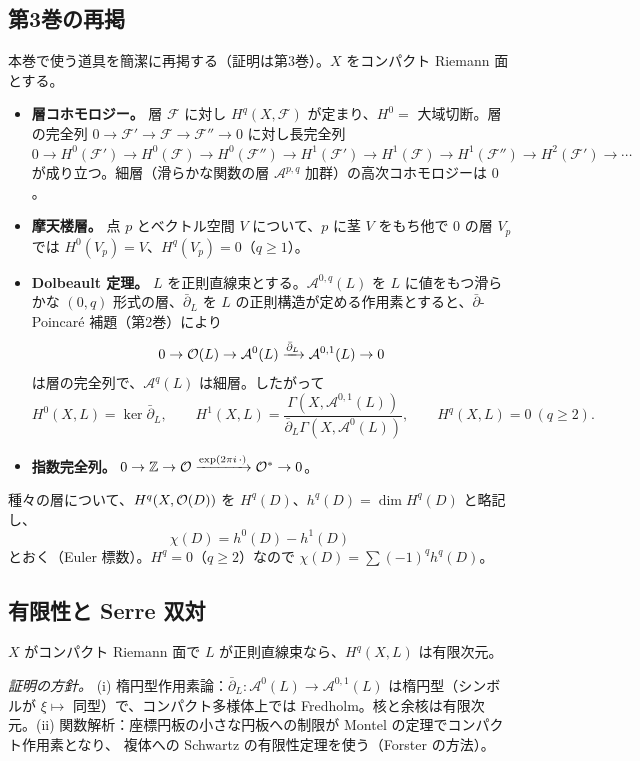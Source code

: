 \subsection{第3巻の再掲}
本巻で使う道具を簡潔に再掲する（証明は第3巻）。$X$ をコンパクト Riemann 面とする。
\begin{itemize}
\item \textbf{層コホモロジー。} 層 $\mathcal F$ に対し $H^q(X,\mathcal F)$ が定まり、$H^0=$ 大域切断。層の完全列 $0\to\mathcal F'\to\mathcal F\to\mathcal F''\to0$ に対し長完全列 $0\to H^0(\mathcal F')\to H^0(\mathcal F)\to H^0(\mathcal F'')\to H^1(\mathcal F')\to H^1(\mathcal F)\to H^1(\mathcal F'')\to H^2(\mathcal F')\to\cdots$ が成り立つ。細層（滑らかな関数の層 $\mathcal A^{p,q}$ 加群）の高次コホモロジーは $0$。
\item \textbf{摩天楼層。} 点 $p$ とベクトル空間 $V$ について、$p$ に茎 $V$ をもち他で $0$ の層 $V_p$ では $H^0(V_p)=V$、$H^q(V_p)=0$（$q\ge1$）。
\item \textbf{Dolbeault 定理。} $L$ を正則直線束とする。$\mathcal A^{0,q}(L)$ を $L$ に値をもつ滑らかな $(0,q)$ 形式の層、$\bar\partial_L$ を $L$ の正則構造が定める作用素とすると、$\bar\partial$-Poincaré 補題（第2巻）により
\[
0\to\mathcal O(L)\to\mathcal A^0(L)\xrightarrow{\bar\partial_L}\mathcal A^{0,1}(L)\to0
\]
は層の完全列で、$\mathcal A^q(L)$ は細層。したがって
\[
H^0(X,L)=\ker\bar\partial_L,\qquad H^1(X,L)=\frac{\Gamma(X,\mathcal A^{0,1}(L))}{\bar\partial_L\Gamma(X,\mathcal A^0(L))},\qquad H^q(X,L)=0\ (q\ge2).
\]
\item \textbf{指数完全列。} $0\to\mathbb Z\to\mathcal O\xrightarrow{\exp(2\pi i\,\cdot)}\mathcal O^*\to0$。
\end{itemize}
種々の層について、$H^q(X,\mathcal O(D))$ を $H^q(D)$、$h^q(D)=\dim H^q(D)$ と略記し、
\[
\chi(D)=h^0(D)-h^1(D)
\]
とおく（Euler 標数）。$H^q=0$（$q\ge2$）なので $\chi(D)=\sum(-1)^qh^q(D)$。

\subsection{有限性と Serre 双対}
\begin{thm}[有限性定理]\label{thm:finite}
$X$ がコンパクト Riemann 面で $L$ が正則直線束なら、$H^q(X,L)$ は有限次元。
\end{thm}
\emph{証明の方針。} (i) 楕円型作用素論：$\bar\partial_L:\mathcal A^0(L)\to\mathcal A^{0,1}(L)$ は楕円型（シンボルが $\xi\mapsto$ 同型）で、コンパクト多様体上では Fredholm。核と余核は有限次元。(ii) 関数解析：座標円板の小さな円板への制限が Montel の定理でコンパクト作用素となり、\Cech{} 複体への Schwartz の有限性定理を使う（Forster の方法）。

